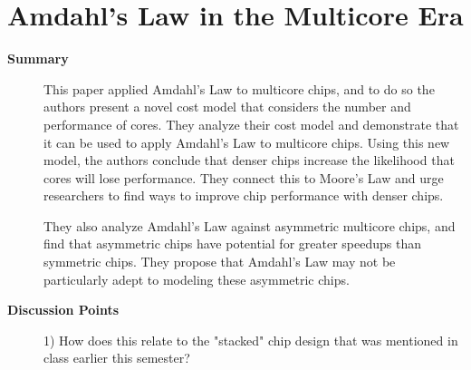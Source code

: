 \section {Amdahl’s Law in the Multicore Era \cite{hill2008amdahl}}

\begin{description}
    \item[\textbf{Summary}]
    This paper applied Amdahl's Law to multicore chips, and to do so the authors
    present a novel cost model that considers the number and performance of
    cores. They analyze their cost model and demonstrate that it can be used to
    apply Amdahl's Law to multicore chips. Using this new model, the authors
    conclude that denser chips increase the likelihood that cores will lose
    performance. They connect this to Moore's Law and urge researchers to find
    ways to improve chip performance with denser chips.

    They also analyze Amdahl's Law against asymmetric multicore chips, and find
    that asymmetric chips have potential for greater speedups than symmetric
    chips. They propose that Amdahl's Law may not be particularly adept to
    modeling these asymmetric chips.
    \item[\textbf{Discussion Points}]
    1) How does this relate to the "stacked" chip design that was mentioned in
    class earlier this semester?
\end{description}